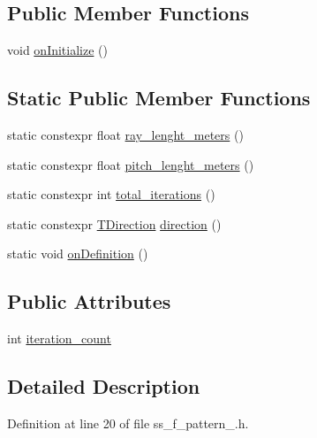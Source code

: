 \subsection*{Public Member Functions}
\begin{DoxyCompactItemize}
\item 
void \hyperlink{structsm__dance__bot_1_1SS4_1_1SsFPattern1_af69988c9481251c8e830779732db18cb}{on\+Initialize} ()
\end{DoxyCompactItemize}
\subsection*{Static Public Member Functions}
\begin{DoxyCompactItemize}
\item 
static constexpr float \hyperlink{structsm__dance__bot_1_1SS4_1_1SsFPattern1_ab6c84af47649dfe8cc5f2097ab01968b}{ray\+\_\+lenght\+\_\+meters} ()
\item 
static constexpr float \hyperlink{structsm__dance__bot_1_1SS4_1_1SsFPattern1_a603b30123514bdab9efbfc8c2069587c}{pitch\+\_\+lenght\+\_\+meters} ()
\item 
static constexpr int \hyperlink{structsm__dance__bot_1_1SS4_1_1SsFPattern1_a5c074a09438a374f3c8b268360936025}{total\+\_\+iterations} ()
\item 
static constexpr \hyperlink{namespacesm__dance__bot_1_1SS4_a8cc908c11b286e3f0591930361cc427e}{T\+Direction} \hyperlink{structsm__dance__bot_1_1SS4_1_1SsFPattern1_a4d286cea10dd7a14743a89f5a2131dc5}{direction} ()
\item 
static void \hyperlink{structsm__dance__bot_1_1SS4_1_1SsFPattern1_a29e23974126c002b96ecd1d3df40632c}{on\+Definition} ()
\end{DoxyCompactItemize}
\subsection*{Public Attributes}
\begin{DoxyCompactItemize}
\item 
int \hyperlink{structsm__dance__bot_1_1SS4_1_1SsFPattern1_abd668281596d2fc992d26eec97e69cb6}{iteration\+\_\+count}
\end{DoxyCompactItemize}


\subsection{Detailed Description}


Definition at line 20 of file ss\+\_\+f\+\_\+pattern\+\_.\+h.



